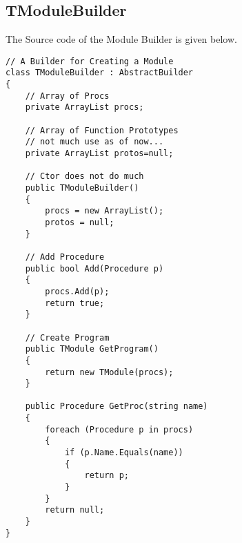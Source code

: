 \subsection{TModuleBuilder}
The Source code of the Module Builder is given below.
\lstset{style=csharp}
\begin{lstlisting}
// A Builder for Creating a Module
class TModuleBuilder : AbstractBuilder
{
	// Array of Procs
	private ArrayList procs;

	// Array of Function Prototypes
	// not much use as of now...
	private ArrayList protos=null;

	// Ctor does not do much
	public TModuleBuilder()
	{
		procs = new ArrayList();
		protos = null;
	}
	
	// Add Procedure
	public bool Add(Procedure p)
	{
		procs.Add(p);
		return true;
	}

	// Create Program
	public TModule GetProgram()
	{
		return new TModule(procs);
	}
	
	public Procedure GetProc(string name)
	{
		foreach (Procedure p in procs)
		{
			if (p.Name.Equals(name))
			{
				return p;
			}
		}
		return null;
	}
}
\end{lstlisting}
